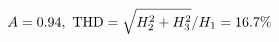 \documentclass[preview]{standalone}
\begin{document}
\begin{align*}
\special{dvisvgm:raw <g id='unique000'>}A=0.94,\ \text{THD}=\sqrt{H_2^2+H_3^2}/H_1=16.7\%\special{dvisvgm:raw </g>}
\end{align*}
\end{document}
